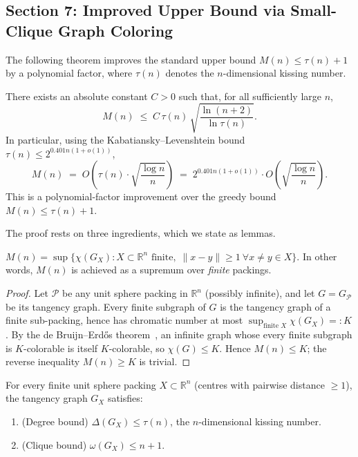 \subsection*{Section 7: Improved Upper Bound via Small-Clique Graph Coloring}

The following theorem improves the standard upper bound $M(n)\le \tau(n)+1$ by a polynomial factor, where $\tau(n)$ denotes the $n$-dimensional kissing number.

\begin{theorem}\label{thm:upper-bound}
There exists an absolute constant $C>0$ such that, for all sufficiently large $n$,
\[
  M(n) \;\le\; C\,\tau(n)\,\sqrt{\frac{\ln(n+2)}{\ln \tau(n)}}.
\]
In particular, using the Kabatiansky--Levenshtein bound $\tau(n)\le 2^{0.401n(1+o(1))}$,
\[
  M(n) \;=\; O\!\left(\tau(n)\cdot\sqrt{\frac{\log n}{n}}\right)
  \;=\; 2^{0.401n(1+o(1))}\cdot O\!\left(\sqrt{\frac{\log n}{n}}\right).
\]
This is a polynomial-factor improvement over the greedy bound $M(n)\le\tau(n)+1$.
\end{theorem}

The proof rests on three ingredients, which we state as lemmas.

\begin{lemma}\label{lem:compactness}
$M(n) = \sup\bigl\{\chi(G_X) : X\subset\mathbb{R}^n\text{ finite},\;\|x-y\|\ge 1\ \forall x\ne y\in X\bigr\}.$
In other words, $M(n)$ is achieved as a supremum over \emph{finite} packings.
\end{lemma}

\begin{proof}
Let $\mathcal{P}$ be any unit sphere packing in $\mathbb{R}^n$ (possibly infinite), and let $G=G_{\mathcal{P}}$ be its tangency graph.  Every finite subgraph of $G$ is the tangency graph of a finite sub-packing, hence has chromatic number at most $\sup_{\text{finite }X}\chi(G_X)=:K$.  By the de Bruijn--Erd\H{o}s theorem~\cite{dBE1951}, an infinite graph whose every finite subgraph is $K$-colorable is itself $K$-colorable, so $\chi(G)\le K$.  Hence $M(n)\le K$; the reverse inequality $M(n)\ge K$ is trivial.
\end{proof}

\begin{lemma}\label{lem:graph-bounds}
For every finite unit sphere packing $X\subset\mathbb{R}^n$ (centres with pairwise distance $\ge 1$), the tangency graph $G_X$ satisfies:
\begin{enumerate}
  \item[\textup{(a)}] \textup{(Degree bound)} $\Delta(G_X)\le\tau(n)$, the $n$-dimensional kissing number.
  \item[\textup{(b)}] \textup{(Clique bound)} $\omega(G_X)\le n+1$.
\end{enumerate}
\end{lemma}

